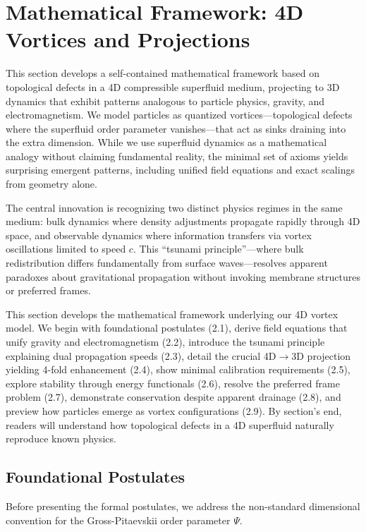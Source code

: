 \section{Mathematical Framework: 4D Vortices and Projections}

This section develops a self-contained mathematical framework based on topological defects in a 4D compressible superfluid medium, projecting to 3D dynamics that exhibit patterns analogous to particle physics, gravity, and electromagnetism. We model particles as quantized vortices---topological defects where the superfluid order parameter vanishes---that act as sinks draining into the extra dimension. While we use superfluid dynamics as a mathematical analogy without claiming fundamental reality, the minimal set of axioms yields surprising emergent patterns, including unified field equations and exact scalings from geometry alone.

The central innovation is recognizing two distinct physics regimes in the same medium: bulk dynamics where density adjustments propagate rapidly through 4D space, and observable dynamics where information transfers via vortex oscillations limited to speed $c$. This ``tsunami principle''---where bulk redistribution differs fundamentally from surface waves---resolves apparent paradoxes about gravitational propagation without invoking membrane structures or preferred frames.

This section develops the mathematical framework underlying our 4D vortex model. We begin with foundational postulates (2.1), derive field equations that unify gravity and electromagnetism (2.2), introduce the tsunami principle explaining dual propagation speeds (2.3), detail the crucial 4D$\to$3D projection yielding 4-fold enhancement (2.4), show minimal calibration requirements (2.5), explore stability through energy functionals (2.6), resolve the preferred frame problem (2.7), demonstrate conservation despite apparent drainage (2.8), and preview how particles emerge as vortex configurations (2.9). By section's end, readers will understand how topological defects in a 4D superfluid naturally reproduce known physics.

\subsection{Foundational Postulates}

Before presenting the formal postulates, we address the non-standard dimensional convention for the Gross-Pitaevskii order parameter $\Psi$.

